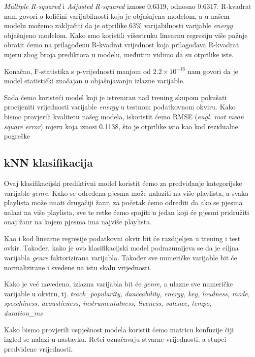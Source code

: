 	\textit{Multiple R-squared} i \textit{Adjusted R-squared} iznose 0.6319, odnosno 0.6317. R-kvadrat nam govori o količini varijabilnosti koja je objašnjena modelom, a u našem modelu možemo zaključiti da je otprilike 63\% varijabilnosti varijable \textit{energy} objašnjeno modelom. Kako smo koristili višestruku linearnu regresiju više pažnje obratit ćemo na prilagođenu R-kvadrat vrijednost koja prilagođava R-kvadrat mjeru zbog broja prediktora u modelu, međutim vidimo da su otprilike iste.
	
	Konačno, F-statistika s p-vrijednosti manjom od \(2.2 \times 10^{-16}\) nam govori da je model statistički značajan u objašnjavanju izlazne varijable.
	
	
	Sada ćemo koristeći model koji je istreniran nad trening skupom pokušati procijeniti vrijednosti varijable \textit{energy} u testnom podatkovnom okviru. Kako bismo provjerili kvalitetu našeg modela, iskoristit ćemo RMSE (\textit{engl. root mean square error}) mjeru koja iznosi 0.1138, što je otprilike isto kao kod rezidualne pogreške
	
	\subsection{kNN klasifikacija}
	
	Ovaj klasifikacijski prediktivni model koristit ćemo za predviđanje kategorijske varijable \textit{genre}. Kako se određena pjesma može nalaziti na više playlista, a svaka playlista može imati drugačiji žanr, za početak ćemo odrediti da ako se pjesma nalazi na više playlista, sve te retke ćemo spojiti u jedan koji će pjesmi pridružiti onaj žanr na kojem pjesma ima najviše playlista. 
	
	Kao i kod linearne regresije podatkovni okvir bit će razdijeljen u trening i test ovkir. Također, kako je ovo klasifikacijski model podrazumijeva se da je ciljna varijabla \textit{genre} faktorizirana varijabla. Također sve numeričke varijable bit će normalizirane i svedene na istu skalu vrijednosti. 
	
	Kako je već navedeno, izlazna varijabla bit će \textit{genre}, a ulazne sve numeričke varijable u okviru, tj. \textit{track\_popularity, danceability, energy, key, loudness, mode, speechiness, acousticness, instrumentalness, liveness, valence, tempo, duration\_ms}
	
	Kako bismo provjerili uspješnost modela koristit ćemo matricu konfuzije čiji izgled se nalazi u nastavku. Retci označavaju stvarne vrijednosti, a stupci predviđene vrijednosti.
	
